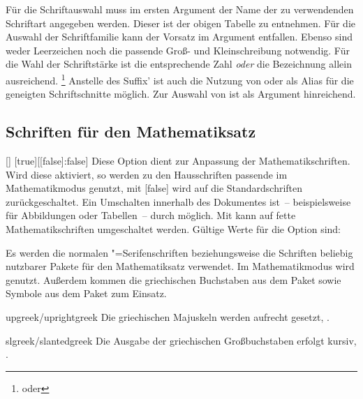 \begin{Declaration*}{}
\begin{Declaration*}{}
\begin{Declaration*}{}
\begin{Declaration}[v2.04]{}
\begin{Declaration}[v2.04]{%
}
Für die Schriftauswahl muss im ersten Argument der Name der zu verwendenden 
Schriftart angegeben werden. Dieser ist der obigen Tabelle zu entnehmen. Für 
die Auswahl der Schriftfamilie \Univers kann der Vorsatz  im 
Argument  entfallen. Ebenso sind weder Leerzeichen noch die 
passende Groß- und Kleinschreibung notwendig. Für die Wahl der Schriftstärke 
ist die entsprechende Zahl \emph{oder} die Bezeichnung allein ausreichend.%
\footnote{ oder }
Anstelle des Suffix'  ist auch die Nutzung von  
oder  als Alias für die geneigten Schriftschnitte möglich. Zur 
Auswahl von \DIN ist  als Argument hinreichend.
\end{Declaration}
\end{Declaration}


\subsection{Schriften für den Mathematiksatz}
%
%
%
\begin{Declaration}[v2.03]{[\PBoolean]}%
  [true][[false]:false]
\printdeclarationlist%
\label{sec:math}%
%
Diese Option dient zur Anpassung der Mathematikschriften. Wird diese aktiviert, 
so werden zu den Hausschriften passende im Mathematikmodus genutzt, mit 
[false] wird auf die Standardschriften zurückgeschaltet. Ein 
Umschalten innerhalb des Dokumentes ist~-- beispielsweise für Abbildungen oder 
Tabellen~-- durch  
möglich. Mit  kann auf fette Mathematikschriften umgeschaltet 
werden. Gültige Werte für die Option  sind:
%
\begin{values}
\itemfalse
  Es werden die normalen "=Serifenschriften beziehungsweise die 
  Schriften beliebig nutzbarer Pakete für den Mathematiksatz verwendet.
\itemtrue*
  Im Mathematikmodus wird \Univers genutzt. Außerdem kommen die griechischen 
  Buchstaben aus dem Paket  sowie Symbole aus dem Paket 
   zum Einsatz.
\item[upgreek/uprightgreek]
  Die griechischen Majuskeln werden aufrecht gesetzt, 
  .
\item[slgreek/slantedgreek]
  Die Ausgabe der griechischen Großbuchstaben erfolgt kursiv, 
  .
\end{values}
\end{Declaration}



\end{Declaration*}
\end{Declaration*}
\end{Declaration*}
